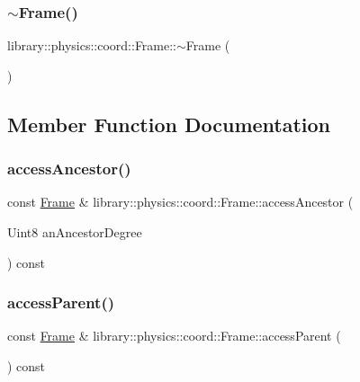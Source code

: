 \subsubsection{\texorpdfstring{$\sim$\+Frame()}{~Frame()}}
{\footnotesize\ttfamily library\+::physics\+::coord\+::\+Frame\+::$\sim$\+Frame (\begin{DoxyParamCaption}{ }\end{DoxyParamCaption})}



\subsection{Member Function Documentation}
\mbox{\label{classlibrary_1_1physics_1_1coord_1_1_frame_a82db48e361c6804146083c7478a2528f}} 
\subsubsection{\texorpdfstring{access\+Ancestor()}{accessAncestor()}}
{\footnotesize\ttfamily const \hyperlink{classlibrary_1_1physics_1_1coord_1_1_frame}{Frame} \& library\+::physics\+::coord\+::\+Frame\+::access\+Ancestor (\begin{DoxyParamCaption}\item[{Uint8}]{an\+Ancestor\+Degree }\end{DoxyParamCaption}) const}

\mbox{\label{classlibrary_1_1physics_1_1coord_1_1_frame_aaa33dd0c2af00aee0ffb4278cccdc8a2}} 
\subsubsection{\texorpdfstring{access\+Parent()}{accessParent()}}
{\footnotesize\ttfamily const \hyperlink{classlibrary_1_1physics_1_1coord_1_1_frame}{Frame} \& library\+::physics\+::coord\+::\+Frame\+::access\+Parent (\begin{DoxyParamCaption}{ }\end{DoxyParamCaption}) const}

